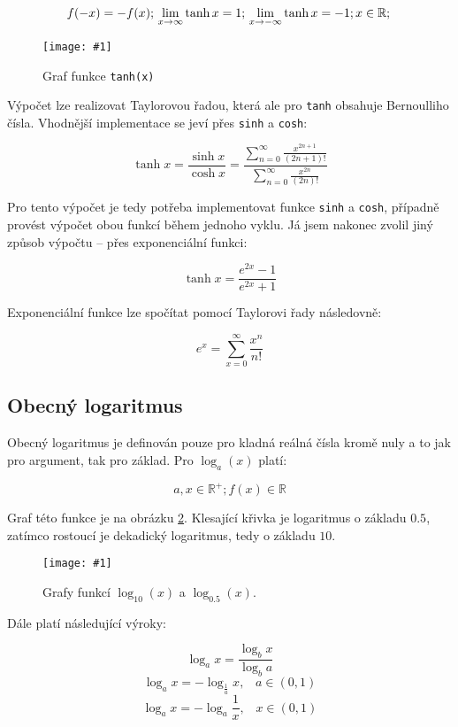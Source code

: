 \documentclass[12pt,a4paper,titlepage,final]{article}
\newcommand{\fig}[3]{%
		\begin{figure}[ht]
			\centering\texttt{[image: \#1]}%
			\caption{#2}%
		\end{figure}
	}
\begin{document}
  \[
  f(-x) = -f(x); \\
  \lim_{x \to \infty} \tanh x = 1; \\
  \lim_{x \to -\infty} \tanh x = -1; \\
  x \in \mathbb{R}; \\
  \]

  \fig{img/tanh.eps}{Graf funkce \texttt{tanh(x)}\label{grf-tanh}}{7cm}

  Výpočet lze realizovat Taylorovou řadou, která ale pro \texttt{tanh} obsahuje
  Bernoulliho čísla. Vhodnější implementace se jeví přes \texttt{sinh} a \texttt{cosh}:

  \[
  \tanh x = \frac{\sinh x}{\cosh x} = \frac{ \sum_{n=0}^{\infty} \frac{x^{2n+1}}{(2n + 1)!} }{ \sum_{n=0}^{\infty} \frac{x^{2n}}{(2n)!} }
  \]
  
  Pro tento výpočet je tedy potřeba implementovat funkce \texttt{sinh} a \texttt{cosh},
  případně provést výpočet obou funkcí během jednoho vyklu. Já jsem nakonec zvolil
  jiný způsob výpočtu -- přes exponenciální funkci:

  \[
  \tanh x = \frac{e^{2x} - 1}{e^{2x} + 1}
  \]

  Exponenciální funkce lze spočítat pomocí Taylorovi řady následovně:
  
  \[
  e^x = \sum_{x=0}^{\infty} \frac{x^n}{n!}
  \]
  

\subsection{Obecný logaritmus} \label{kap-log-mat}

  Obecný logaritmus je definován pouze pro kladná reálná čísla kromě nuly a to
  jak pro argument, tak pro základ. Pro $\log_a(x)$ platí:

  \[
  a, x \in \mathbb R^+;
  f(x) \in \mathbb R
  \]

  Graf této funkce je na obrázku \ref{logax-img}. Klesající křivka je logaritmus
  o základu $0.5$, zatímco rostoucí je dekadický logaritmus, tedy o základu
  $10$.

  \fig{img/logax.eps}{Grafy funkcí $\log_{10}(x)$ a $\log_{0.5}(x)$.\label{logax-img}}{7cm}

  Dále platí následující výroky:

  \[
  \log_a x = \frac{\log_b x}{\log_b a}
  \]
  \[
  \log_a x = -\log_{\frac{1}{a}} x,\;\;\; a \in (0,1)
  \]
  \[
  \log_a x = -\log_a \frac{1}{x},\;\;\; x \in (0,1) 
  \]
\end{document}
